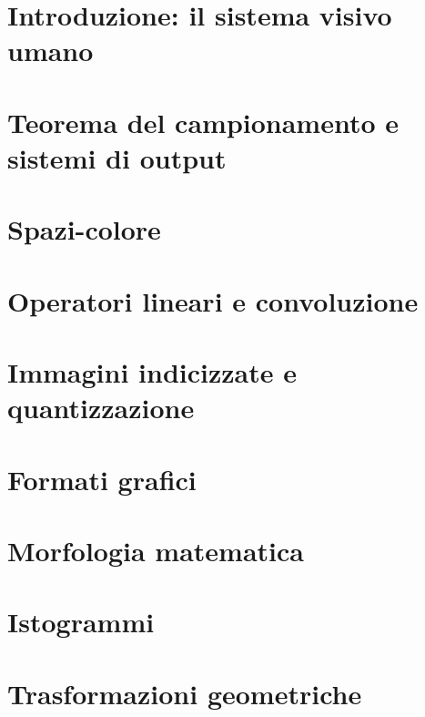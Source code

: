 \documentclass{article}
\begin{document}


\tableofcontents
\restoregeometry

\section{Introduzione: il sistema visivo umano}


\section{Teorema del campionamento e sistemi di output}


\section{Spazi-colore}


\section{Operatori lineari e convoluzione}


\section{Immagini indicizzate e quantizzazione}


\section{Formati grafici}


\section{Morfologia matematica}


\section{Istogrammi}


\section{Trasformazioni geometriche}

\end{document}
